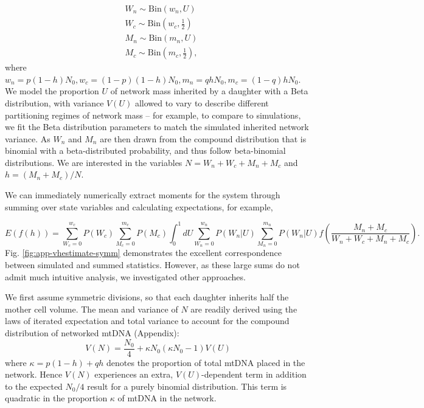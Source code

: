 \documentclass{article}
\begin{document}
\begin{equation}\label{eq:model}
    \begin{split}
        & W_n \sim \mathrm{Bin}\left(w_n,U\right) \\
        & W_c \sim \mathrm{Bin}\left(w_c,\frac{1}{2}\right) \\
        & M_n \sim \mathrm{Bin}\left(m_n,U\right) \\
        & M_c \sim \mathrm{Bin}\left(m_c,\frac{1}{2}\right),
    \end{split}
\end{equation}
where $w_n = p(1-h)N_0, w_c = (1-p)(1-h)N_0, m_n = qhN_0, m_c = (1-q)hN_0$. We model the proportion $U$ of network mass inherited by a daughter with a Beta distribution, with variance $V(U)$ allowed to vary to describe different partitioning regimes of network mass -- for example, to compare to simulations, we fit the Beta distribution parameters to match the simulated inherited network variance. As $W_n$ and $M_n$ are then drawn from the compound distribution that is binomial with a beta-distributed probability, and thus follow beta-binomial distributions. We are interested in the variables $N = W_n+W_c+M_n+M_c$ and $h = (M_n+M_c)/N$.

We can immediately numerically extract moments for the system through summing over state variables and calculating expectations, for example, 

\begin{equation}\label{eq:vh-estimate-moments}
    E(f(h)) = \sum_{W_c = 0}^{w_c} P(W_c) \sum_{M_c = 0}^{m_c} P(M_c) \int_0^1 dU \sum_{W_n = 0}^{w_n} P(W_n|U) \sum_{M_n = 0}^{m_n} P(W_n|U) f\left(\frac{M_n+M_c}{W_n+W_c+M_n+M_c}\right).
\end{equation}
Fig. \ref{fig:app-vhestimate-symm} demonstrates the excellent correspondence between simulated and summed statistics. However, as these large sums do not admit much intuitive analysis, we investigated other approaches. 

We first assume symmetric divisions, so that each daughter inherits half the mother cell volume. The mean and variance of $N$ are readily derived using the laws of iterated expectation and total variance to account for the compound distribution of networked mtDNA (Appendix):
\begin{equation}
    V(N)=\frac{N_0}{4}+\kappa N_0(\kappa N_0-1)V(U)
\end{equation}
where $\kappa = p(1-h)+qh$ denotes the proportion of total mtDNA placed in the network. Hence $V(N)$ experiences an extra, $V(U)$-dependent term in addition to the expected $N_0/4$ result for a purely binomial distribution. This term is quadratic in the proportion $\kappa$ of mtDNA in the network.
\end{document}
